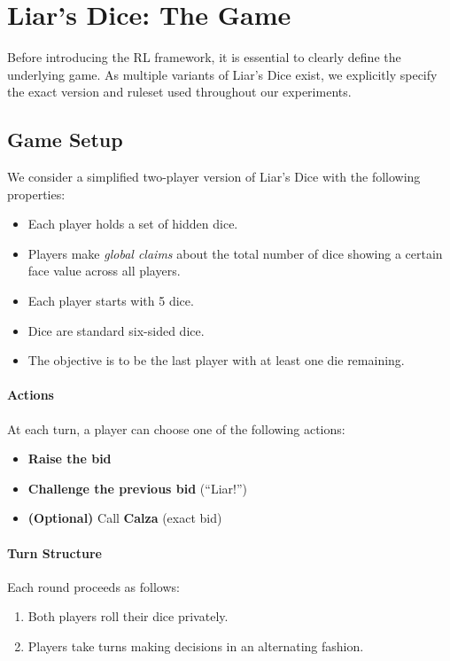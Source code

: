 \documentclass{article}
\begin{document}
\section{Liar's Dice: The Game}

Before introducing the RL framework, it is essential to clearly define the underlying game. As multiple variants of Liar’s Dice exist, we explicitly specify the exact version and ruleset used throughout our experiments.

\subsection{Game Setup}

We consider a simplified two-player version of Liar’s Dice with the following properties:
\begin{itemize}
    \item Each player holds a set of hidden dice.
    \item Players make \textit{global claims} about the total number of dice showing a certain face value across all players.
    \item Each player starts with 5 dice.
    \item Dice are standard six-sided dice.
    \item The objective is to be the last player with at least one die remaining.
\end{itemize}

\paragraph{Actions}

At each turn, a player can choose one of the following actions:
\begin{itemize}
    \item \textbf{Raise the bid}
    \item \textbf{Challenge the previous bid} (``Liar!'')
    \item \textbf{(Optional)} Call \textbf{Calza} (exact bid)
\end{itemize}

\paragraph{Turn Structure}

Each round proceeds as follows:
\begin{enumerate}
    \item Both players roll their dice privately.
    \item Players take turns making decisions in an alternating fashion.
\end{enumerate}
\end{document}
